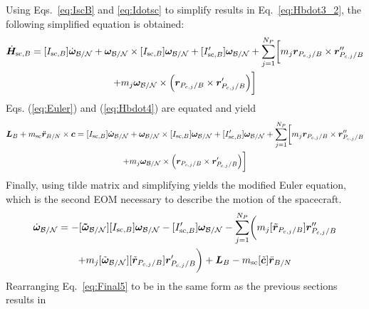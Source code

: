Using Eqs.~\eqref{eq:IscB} and \eqref{eq:Idotsc} to simplify results in Eq.~\eqref{eq:Hbdot3_2}, the following simplified equation is obtained:
\begin{multline}
	\dot{\bm{H}}_{\text{sc},B} = [I_{\text{sc},B}] \dot{\bm\omega}_{\cal B/N} + \bm\omega_{\cal B/N} \times [I_{\text{sc},B}] \bm\omega_{\cal B/N} + [I'_{\text{sc},B}] \bm\omega_{\cal B/N}
	+ \sum\limits_{j=1}^{N_P}\biggl[m_j \bm r_{P_{c,j}/B}\times\bm{r}''_{P_{c,j}/B} \\
	+ m_j \bm\omega_{\cal B/N} \times \Bigl(\bm{r}_{P_{c,j}/B} \times \bm{r}'_{P_{c,j}/B}\Bigr)\biggr]
	\label{eq:Hbdot4}
\end{multline}
Eqs. (\ref{eq:Euler}) and (\ref{eq:Hbdot4}) are equated and yield
\begin{multline}
	\bm{L}_B+m_{\text{sc}}\ddot{\bm r}_{B/N}\times\bm{c} = [I_{\text{sc},B}] \dot{\bm\omega}_{\cal B/N} + \bm\omega_{\cal B/N} \times [I_{\text{sc},B}] \bm\omega_{\cal B/N} + [I'_{\text{sc},B}] \bm\omega_{\cal B/N}
	+ \sum\limits_{j=1}^{N_P}\biggl[m_j \bm r_{P_{c,j}/B}\times\bm{r}''_{P_{c,j}/B}\\
	+ m_j \bm\omega_{\cal B/N} \times \Bigl(\bm{r}_{P_{c,j}/B} \times \bm{r}'_{P_{c,j}/B}\Bigr)\biggr]
\end{multline}
Finally, using tilde matrix and simplifying yields the modified Euler equation, which is the second EOM necessary to describe the motion of the spacecraft.
\begin{multline}
	[I_{\text{sc},B}] \dot{\bm\omega}_{\cal B/N} = -[\bm{\tilde{\omega}}_{\cal B/N}] [I_{\text{sc},B}] \bm\omega_{\cal B/N} - [I'_{\text{sc},B}] \bm\omega_{\cal B/N}	- \sum\limits_{j=1}^{N_P}\biggl(m_j [\tilde{\bm r}_{P_{c,j}/B}]\bm{r}''_{P_{c,j}/B}\\
	+ m_j [\tilde{\bm\omega}_{\cal B/N}] [\tilde{\bm{r}}_{P_{c,j}/B}] \bm{r}'_{P_{c,j}/B}\biggr) + \bm{L}_B - m_{\text{sc}} [\tilde{\bm{c}}] \ddot{\bm r}_{B/N}
	\label{eq:Final5}
\end{multline}
Rearranging Eq.~\eqref{eq:Final5} to be in the same form as the previous sections results in
